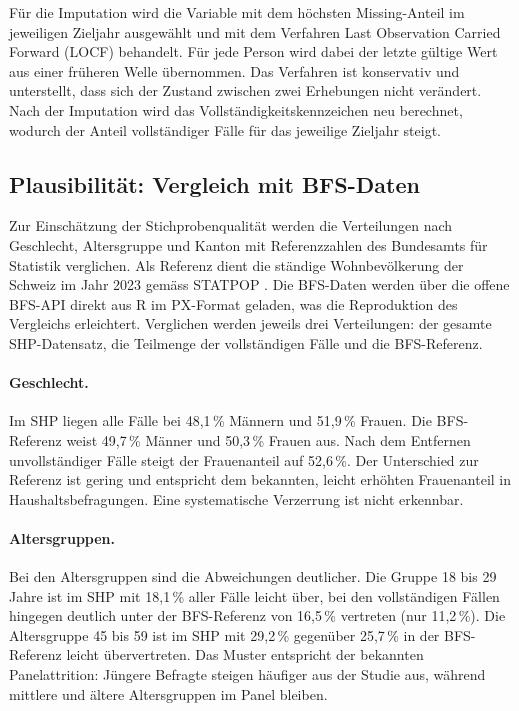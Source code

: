 Für die Imputation wird die Variable mit dem höchsten Missing-Anteil im jeweiligen
Zieljahr ausgewählt und mit dem Verfahren Last Observation Carried Forward (LOCF)
behandelt. Für jede Person wird dabei der letzte gültige Wert aus einer früheren
Welle übernommen. Das Verfahren ist konservativ und unterstellt, dass sich der
Zustand zwischen zwei Erhebungen nicht verändert. Nach der Imputation wird das Vollständigkeitskennzeichen neu berechnet, wodurch der
Anteil vollständiger Fälle für das jeweilige Zieljahr steigt.



\subsection{Plausibilität: Vergleich mit BFS-Daten}
\label{subsec:plausibilitaet}

Zur Einschätzung der Stichprobenqualität werden die Verteilungen nach Geschlecht,
Altersgruppe und Kanton mit Referenzzahlen des Bundesamts für Statistik verglichen.
Als Referenz dient die ständige Wohnbevölkerung der Schweiz im Jahr 2023 gemäss
STATPOP \cite{BFS2023}. Die BFS-Daten werden über die offene BFS-API direkt aus R im
PX-Format geladen, was die Reproduktion des Vergleichs erleichtert. Verglichen werden
jeweils drei Verteilungen: der gesamte SHP-Datensatz, die Teilmenge der vollständigen
Fälle und die BFS-Referenz.

\paragraph{Geschlecht.}
Im SHP liegen alle Fälle bei 48{,}1\,\% Männern und 51{,}9\,\% Frauen. Die BFS-Referenz
weist 49{,}7\,\% Männer und 50{,}3\,\% Frauen aus. Nach dem Entfernen unvollständiger
Fälle steigt der Frauenanteil auf 52{,}6\,\%. Der Unterschied zur Referenz ist gering
und entspricht dem bekannten, leicht erhöhten Frauenanteil in Haushaltsbefragungen.
Eine systematische Verzerrung ist nicht erkennbar.

\paragraph{Altersgruppen.}
Bei den Altersgruppen sind die Abweichungen deutlicher. Die Gruppe 18 bis 29 Jahre ist
im SHP mit 18{,}1\,\% aller Fälle leicht über, bei den vollständigen Fällen hingegen
deutlich unter der BFS-Referenz von 16{,}5\,\% vertreten (nur 11{,}2\,\%). Die
Altersgruppe 45 bis 59 ist im SHP mit 29{,}2\,\% gegenüber 25{,}7\,\% in der
BFS-Referenz leicht übervertreten. Das Muster entspricht der bekannten
Panelattrition: Jüngere Befragte steigen häufiger aus der Studie aus, während mittlere
und ältere Altersgruppen im Panel bleiben.

